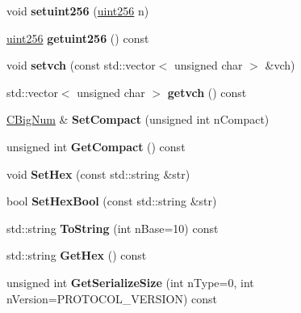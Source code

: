 \begin{DoxyCompactItemize}
\item 
\mbox{\label{class_c_big_num_ade94c52f2f5d5a20e605125fcf727a34}} 
void {\bfseries setuint256} (\mbox{\hyperlink{classuint256}{uint256}} n)
\item 
\mbox{\label{class_c_big_num_a0acdf0ee722fe320e961863b792bf609}} 
\mbox{\hyperlink{classuint256}{uint256}} {\bfseries getuint256} () const
\item 
\mbox{\label{class_c_big_num_aa9236c14e34519e9b173a9a4b80f5621}} 
void {\bfseries setvch} (const std\+::vector$<$ unsigned char $>$ \&vch)
\item 
\mbox{\label{class_c_big_num_a305a57111c97172c76a6145ec840bd74}} 
std\+::vector$<$ unsigned char $>$ {\bfseries getvch} () const
\item 
\mbox{\label{class_c_big_num_a27e3ca82a40ae0c34ac4c059e4d0d66c}} 
\mbox{\hyperlink{class_c_big_num}{C\+Big\+Num}} \& {\bfseries Set\+Compact} (unsigned int n\+Compact)
\item 
\mbox{\label{class_c_big_num_aa874461cf2cfb497f2c9f20e66106d0b}} 
unsigned int {\bfseries Get\+Compact} () const
\item 
\mbox{\label{class_c_big_num_a9d4f7c42f141e45410af96e6804c54fe}} 
void {\bfseries Set\+Hex} (const std\+::string \&str)
\item 
\mbox{\label{class_c_big_num_a2e56f585db3f9d887bb945de8a36d4a5}} 
bool {\bfseries Set\+Hex\+Bool} (const std\+::string \&str)
\item 
\mbox{\label{class_c_big_num_a10da7a8b4984feee0bb0f01ef2e74da8}} 
std\+::string {\bfseries To\+String} (int n\+Base=10) const
\item 
\mbox{\label{class_c_big_num_a7b3bda0e9860ce67d99ea6e229cdd648}} 
std\+::string {\bfseries Get\+Hex} () const
\item 
\mbox{\label{class_c_big_num_afc5b1e40f9267193a628b74fec2ffb4c}} 
unsigned int {\bfseries Get\+Serialize\+Size} (int n\+Type=0, int n\+Version=P\+R\+O\+T\+O\+C\+O\+L\+\_\+\+V\+E\+R\+S\+I\+ON) const

\end{DoxyCompactItemize}
